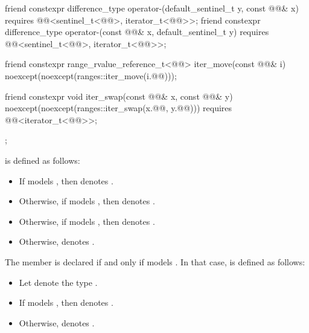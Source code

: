 \begin{codeblock}
{{    friend constexpr difference_type operator-(default_sentinel_t y, const @@& x)
      requires @@<sentinel_t<@@>, iterator_t<@@>>;
    friend constexpr difference_type operator-(const @@& x, default_sentinel_t y)
      requires @@<sentinel_t<@@>, iterator_t<@@>>;

    friend constexpr range_rvalue_reference_t<@@> iter_move(const @@& i)
      noexcept(noexcept(ranges::iter_move(i.@@)));

    friend constexpr void iter_swap(const @@& x, const @@& y)
      noexcept(noexcept(ranges::iter_swap(x.@@, y.@@)))
      requires @@<iterator_t<@@>>;
  };
}
\end{codeblock}

\pnum
{} is defined as follows:
\begin{itemize}
\item
If  models ,
then  denotes .
\item
Otherwise, if  models ,
then  denotes .
\item
Otherwise, if  models ,
then  denotes .
\item
Otherwise,  denotes .
\end{itemize}

\pnum
The member   is declared
if and only if  models .
In that case,
 is defined as follows:
\begin{itemize}
\item
Let  denote
the type .
\item
If  models
,
then  denotes .
\item
Otherwise,  denotes .
\end{itemize}

